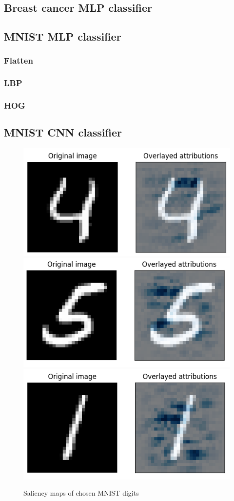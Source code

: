\documentclass[journal, a4paper]{IEEEtran}
\begin{document}
\subsection{Breast cancer MLP classifier}\label{subsec:experiment-cancer}

\subsection{MNIST MLP classifier}\label{subsec:experiment-mnist-mlp}

\subsubsection{Flatten}
\subsubsection{LBP}
\subsubsection{HOG}

\subsection{MNIST CNN classifier}\label{subsec:experiment-mnist-cnn}

\begin{figure}[ht]\centering
    \includegraphics[width=.6\linewidth]{img/saliency_mnist/4.png}
    \includegraphics[width=.6\linewidth]{img/saliency_mnist/5.png}
    \includegraphics[width=.6\linewidth]{img/saliency_mnist/1.png}
    \caption{Saliency maps of chosen MNIST digits}\label{fig:mnist-cnn-saliency}
\end{figure}
\end{document}
